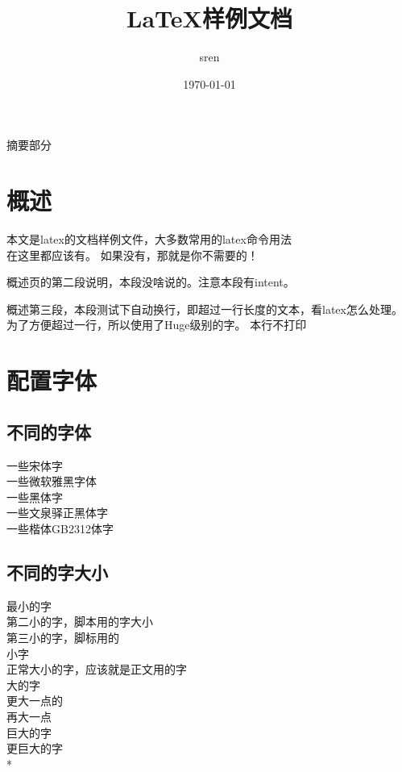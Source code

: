 \documentclass[a4paper,12pt]{article} %
\title{LaTeX样例文档}
\author{sren}
\date{\today}
\begin{document}
\maketitle
\thispagestyle{empty} %


\newpage
{}
摘要部分


\newpage
\tableofcontents
\newpage




\newpage %
 \section{概述}
 本文是latex的文档样例文件，大多数常用的latex命令用法\\在这里都应该有。
 如果没有，那就是你不需要的！

 概述页的第二段说明，本段没啥说的。注意本段有intent。

 {\Huge 概述第三段，本段测试下自动换行，即超过一行长度的文本，看latex怎么处理。为了方便超过一行，所以使用了Huge级别的字。}
 {\kill 本行不打印}
 \pagebreak

 
 \section[pz字体]{配置字体} %
 \subsection{不同的字体}
 { 一些宋体字}\\ %
 { 一些微软雅黑字体}\\
 { 一些黑体字}\\
 { 一些文泉驿正黑体字}\\
 { 一些楷体GB2312体字}\\

 \subsection*{不同的字大小} %
 {\tiny 最小的字 }\\
 {\scriptsize 第二小的字，脚本用的字大小}\\
 {\footnotesize 第三小的字，脚标用的}\\
 {\small 小字}\\
 {\normalsize 正常大小的字，应该就是正文用的字 }\\
 {\large 大的字 }\\
 {\Large 更大一点的}\\
 {\LARGE 再大一点}\\
 {\huge 巨大的字}\\
 {\Huge 更巨大的字}\\* %
\end{document}
